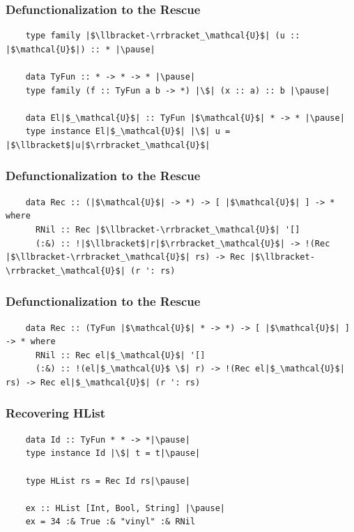 \documentclass[12pt]{beamer}
\begin{document}
\begin{frame}[fragile]
  \frametitle{Defunctionalization to the Rescue} %
  \begin{lstlisting}
    type family |$\llbracket-\rrbracket_\mathcal{U}$| (u :: |$\mathcal{U}$|) :: * |\pause|

    data TyFun :: * -> * -> * |\pause|
    type family (f :: TyFun a b -> *) |\$| (x :: a) :: b |\pause|

    data El|$_\mathcal{U}$| :: TyFun |$\mathcal{U}$| * -> * |\pause|
    type instance El|$_\mathcal{U}$| |\$| u = |$\llbracket$|u|$\rrbracket_\mathcal{U}$|
  \end{lstlisting}
\end{frame}


\begin{frame}[fragile]
  \frametitle{Defunctionalization to the Rescue}
  \begin{lstlisting}
    data Rec :: (|$\mathcal{U}$| -> *) -> [ |$\mathcal{U}$| ] -> * where
      RNil :: Rec |$\llbracket-\rrbracket_\mathcal{U}$| '[]
      (:&) :: !|$\llbracket$|r|$\rrbracket_\mathcal{U}$| -> !(Rec |$\llbracket-\rrbracket_\mathcal{U}$| rs) -> Rec |$\llbracket-\rrbracket_\mathcal{U}$| (r ': rs)
  \end{lstlisting}
\end{frame}

\begin{frame}[fragile]
  \frametitle{Defunctionalization to the Rescue}
  \begin{lstlisting}
    data Rec :: (TyFun |$\mathcal{U}$| * -> *) -> [ |$\mathcal{U}$| ] -> * where
      RNil :: Rec el|$_\mathcal{U}$| '[]
      (:&) :: !(el|$_\mathcal{U}$ \$| r) -> !(Rec el|$_\mathcal{U}$| rs) -> Rec el|$_\mathcal{U}$| (r ': rs)
  \end{lstlisting}
\end{frame}

\begin{frame}[fragile]
  \frametitle{Recovering HList}\pause
  \begin{lstlisting}
    data Id :: TyFun * * -> *|\pause|
    type instance Id |\$| t = t|\pause|

    type HList rs = Rec Id rs|\pause|

    ex :: HList [Int, Bool, String] |\pause|
    ex = 34 :& True :& "vinyl" :& RNil
  \end{lstlisting}
\end{frame}
\end{document}
